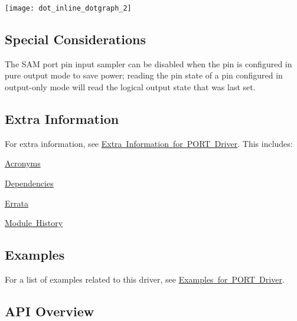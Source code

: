 \begin{DoxyImageNoCaption}
  \mbox{\texttt{[image: dot\_inline\_dotgraph\_2]}}
\end{DoxyImageNoCaption}
\hypertarget{group__asfdoc__sam0__port__group_asfdoc_sam0_port_special_considerations}{}\subsection{Special Considerations}\label{group__asfdoc__sam0__port__group_asfdoc_sam0_port_special_considerations}
The S\+AM port pin input sampler can be disabled when the pin is configured in pure output mode to save power; reading the pin state of a pin configured in output-\/only mode will read the logical output state that was last set.\hypertarget{group__asfdoc__sam0__port__group_asfdoc_sam0_port_extra_info}{}\subsection{Extra Information}\label{group__asfdoc__sam0__port__group_asfdoc_sam0_port_extra_info}
For extra information, see \mbox{\hyperlink{asfdoc_sam0_port_extra}{Extra Information for P\+O\+RT Driver}}. This includes\+:
\begin{DoxyItemize}
\item \mbox{\hyperlink{asfdoc_sam0_port_extra_asfdoc_sam0_port_extra_acronyms}{Acronyms}}
\item \mbox{\hyperlink{asfdoc_sam0_port_extra_asfdoc_sam0_port_extra_dependencies}{Dependencies}}
\item \mbox{\hyperlink{asfdoc_sam0_port_extra_asfdoc_sam0_port_extra_errata}{Errata}}
\item \mbox{\hyperlink{asfdoc_sam0_port_extra_asfdoc_sam0_port_extra_history}{Module History}}
\end{DoxyItemize}\hypertarget{group__asfdoc__sam0__port__group_asfdoc_sam0_port_examples}{}\subsection{Examples}\label{group__asfdoc__sam0__port__group_asfdoc_sam0_port_examples}
For a list of examples related to this driver, see \mbox{\hyperlink{asfdoc_sam0_port_exqsg}{Examples for P\+O\+RT Driver}}.\hypertarget{group__asfdoc__sam0__port__group_asfdoc_sam0_port_api_overview}{}\subsection{A\+P\+I Overview}\label{group__asfdoc__sam0__port__group_asfdoc_sam0_port_api_overview}


